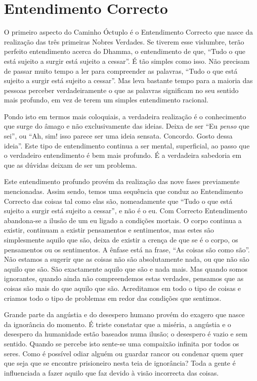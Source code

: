 \clearpage

\section{Entendimento Correcto}

O primeiro aspecto do Caminho Óctuplo é o Entendimento Correcto que nasce da
realização das três primeiras Nobres Verdades. Se tiverem esse vislumbre, terão
perfeito entendimento acerca do Dhamma, o entendimento de que, “Tudo o que está
sujeito a surgir está sujeito a cessar”. É tão simples como isso. Não precisam
de passar muito tempo a ler para compreender as palavras, “Tudo o que está
sujeito a surgir está sujeito a cessar”. Mas leva bastante tempo para a maioria
das pessoas perceber verdadeiramente o que as palavras significam no seu sentido
mais profundo, em vez de terem um simples entendimento racional.

Pondo isto em termos mais coloquiais, a verdadeira realização é o conhecimento
que surge do âmago e não exclusivamente das ideias. Deixa de ser “Eu
\emph{penso} que sei”, ou “Ah, sim! isso parece ser uma ideia sensata. Concordo.
Gosto dessa ideia”. Este tipo de entendimento continua a ser mental,
superficial, ao passo que o verdadeiro entendimento é bem mais profundo. É a
verdadeira sabedoria em que as dúvidas deixam de ser um problema.

Este entendimento profundo provém da realização das nove fases previamente
mencionadas. Assim sendo, temos uma sequência que conduz ao Entendimento
Correcto das coisas tal como elas são, nomeadamente que “Tudo o que está sujeito
a surgir está sujeito a cessar”, e não é o eu. Com Correcto Entendimento
abandona-se a ilusão de um eu ligado a condições mortais. O corpo continua a
existir, continuam a existir pensamentos e sentimentos, mas estes são
simplesmente aquilo que são, deixa de existir a crença de que se é o corpo, os
pensamentos ou os sentimentos. A ênfase está na frase, “As coisas são como são”.
Não estamos a sugerir que as coisas não são absolutamente nada, ou que não são
aquilo que são. São exactamente aquilo que são e nada mais. Mas quando somos
ignorantes, quando ainda não compreendemos estas verdades, pensamos que as
coisas são mais do que aquilo que são. Acreditamos em todo o tipo de coisas e
criamos todo o tipo de problemas em redor das condições que sentimos.

Grande parte da angústia e do desespero humano provém do exagero que nasce da
ignorância do momento. É triste constatar que a miséria, a angústia e o
desespero da humanidade estão baseados numa ilusão; o desespero é vazio e sem
sentido. Quando se percebe isto sente-se uma compaixão infinita por todos os
seres. Como é possível odiar alguém ou guardar rancor ou condenar quem quer que
seja que se encontre prisioneiro nesta teia de ignorância? Toda a gente é
influenciada a fazer aquilo que faz devido à visão incorrecta das coisas.

